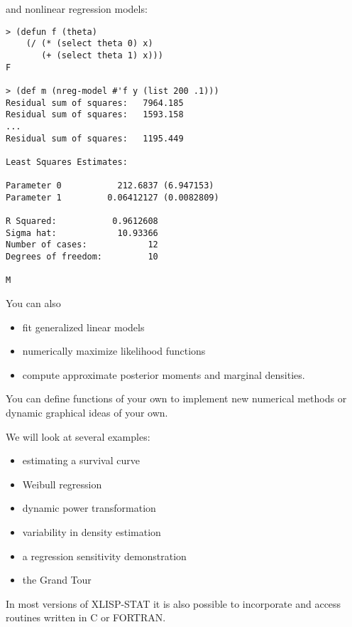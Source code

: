 \begin{slide}{}
and nonlinear regression models:
{\Large
\begin{verbatim}
> (defun f (theta)
    (/ (* (select theta 0) x)
       (+ (select theta 1) x)))
F

> (def m (nreg-model #'f y (list 200 .1)))
Residual sum of squares:   7964.185
Residual sum of squares:   1593.158
...
Residual sum of squares:   1195.449

Least Squares Estimates:

Parameter 0           212.6837 (6.947153)
Parameter 1         0.06412127 (0.0082809)

R Squared:           0.9612608
Sigma hat:            10.93366
Number of cases:            12
Degrees of freedom:         10

M
\end{verbatim}}
\end{slide}

\begin{slide}{}
You can also
\begin{itemize}
\item fit generalized linear models
\item numerically maximize likelihood functions
\item compute approximate posterior moments and marginal densities.
\end{itemize}
\end{slide}

\begin{slide}{}
You can define functions of your own to implement new numerical
methods or dynamic graphical ideas of your own.

We will look at several examples:
\begin{itemize}
\item estimating a survival curve
\item Weibull regression
\item dynamic power transformation
\item variability in density estimation
\item a regression sensitivity demonstration
\item the Grand Tour
\end{itemize}

In most versions of XLISP-STAT it is also possible to incorporate and
access routines written in C or FORTRAN.
\end{slide}
